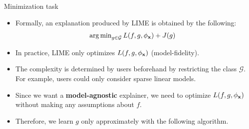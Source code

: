 \documentclass[11pt,compress,t,notes=noshow, xcolor=table]{beamer}
\newcommand{\Gspace}{\mathcal{G}}
\newcommand{\neigh}{\phi_{\xv}}
\begin{document}
\begin{vbframe}{Minimization task}
	\begin{itemize}
		\item Formally, an explanation produced by LIME is obtained by the following: 
		$$ \argmin_{g \in \Gspace} L(f, g, \neigh) + J(g)$$
		\item In practice, LIME only optimizes $L(f, g, \neigh)$ (model-fidelity). 	
		\item The complexity is determined by users beforehand by restricting the class $\Gspace$. For example, users could only consider sparse linear models. 
		\item Since we want a \textbf{model-agnostic} explainer, we need to optimize $L(f, g, \neigh)$ without making any assumptions about $f$. 
		\item Therefore, we learn $g$ only approximately with the following algorithm.  
		\end{itemize}
\end{vbframe} 
\end{document}

